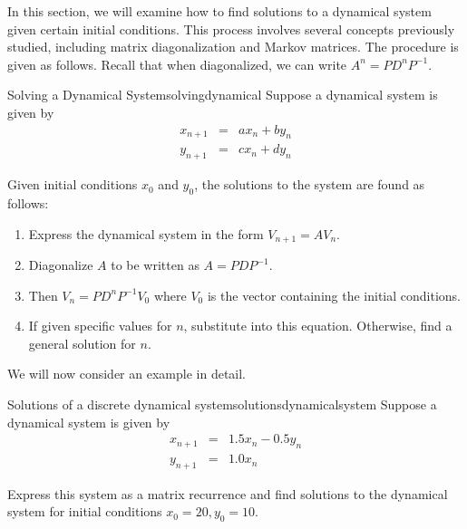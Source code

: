 In this section, we will examine how to find solutions to a dynamical system given certain initial conditions. This process involves several concepts previously studied, including matrix diagonalization and Markov matrices. The procedure is given as follows. Recall that when diagonalized, we can write $A^{n} = PD^{n}P^{-1}$. 

\begin{procedure}{Solving a Dynamical System}{solvingdynamical}
Suppose a dynamical system is given by  
\begin{eqnarray*}
x_{n+1} &=& a x_n + b y_n \\
y_{n+1} &=& c x_n + d y_n
\end{eqnarray*}

Given initial conditions $x_0$ and $y_0$, the solutions to the system are found as follows:
\begin{enumerate}
\item
Express the dynamical system in the form $V_{n+1} = AV_n$.
\item
Diagonalize $A$ to be written as $A = PDP^{-1}$.
\item 
Then $V_{n} = PD^{n} P^{-1} V_{0}$ where $V_{0}$ is the vector containing the initial conditions. 
\item
If given specific values for $n$, substitute into this equation. Otherwise, find a general solution for $n$.
\end{enumerate}
\end{procedure}

We will now consider an example in detail.

\begin{example}{Solutions of a discrete dynamical system}{solutionsdynamicalsystem}
Suppose a dynamical system is given by 
\begin{eqnarray*}
x_{n+1} &=& 1.5 x_n - 0.5y_n\\
y_{n+1} &=& 1.0 x_n
\end{eqnarray*}

Express this system as a matrix recurrence and find solutions to the dynamical system for initial conditions $x_0=20, y_0=10$. 
\end{example}

